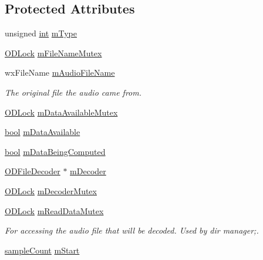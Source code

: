 \subsection*{Protected Attributes}
\begin{DoxyCompactItemize}
\item 
unsigned \hyperlink{xmltok_8h_a5a0d4a5641ce434f1d23533f2b2e6653}{int} \hyperlink{class_o_d_decode_block_file_a004fd4c5c3fccc70c801cd08d06fb3be}{m\+Type}
\item 
\hyperlink{class_o_d_lock}{O\+D\+Lock} \hyperlink{class_o_d_decode_block_file_af3693d7c2dae8daf3c7f0dd83462b7ee}{m\+File\+Name\+Mutex}
\item 
wx\+File\+Name \hyperlink{class_o_d_decode_block_file_a0cbe5f7b9edfe31d13015915023bd925}{m\+Audio\+File\+Name}
\begin{DoxyCompactList}\small\item\em The original file the audio came from. \end{DoxyCompactList}\item 
\hyperlink{class_o_d_lock}{O\+D\+Lock} \hyperlink{class_o_d_decode_block_file_a6680ee34360808f82a0812c2a585eb9a}{m\+Data\+Available\+Mutex}
\item 
\hyperlink{mac_2config_2i386_2lib-src_2libsoxr_2soxr-config_8h_abb452686968e48b67397da5f97445f5b}{bool} \hyperlink{class_o_d_decode_block_file_a32425d79034385bb33e3a3d2572cf920}{m\+Data\+Available}
\item 
\hyperlink{mac_2config_2i386_2lib-src_2libsoxr_2soxr-config_8h_abb452686968e48b67397da5f97445f5b}{bool} \hyperlink{class_o_d_decode_block_file_a3517bed2b598a8b80ae59d83864292ff}{m\+Data\+Being\+Computed}
\item 
\hyperlink{class_o_d_file_decoder}{O\+D\+File\+Decoder} $\ast$ \hyperlink{class_o_d_decode_block_file_a31271342c333fb697e29710ee8e78fda}{m\+Decoder}
\item 
\hyperlink{class_o_d_lock}{O\+D\+Lock} \hyperlink{class_o_d_decode_block_file_a84c27aeea3fe441d208b3b17cd894f6a}{m\+Decoder\+Mutex}
\item 
\hyperlink{class_o_d_lock}{O\+D\+Lock} \hyperlink{class_o_d_decode_block_file_a89c35613a3449bff33cf61ece07071c9}{m\+Read\+Data\+Mutex}
\begin{DoxyCompactList}\small\item\em For accessing the audio file that will be decoded. Used by dir manager;. \end{DoxyCompactList}\item 
\hyperlink{include_2audacity_2_types_8h_afa427e1f521ea5ec12d054e8bd4d0f71}{sample\+Count} \hyperlink{class_o_d_decode_block_file_affe4ddff8785c296ab698c6062c4f362}{m\+Start}

\end{DoxyCompactItemize}
